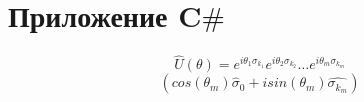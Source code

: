 \documentclass[a4paper]{report}
\begin{document}

\chapter*{Приложение C{$\#$}}

$${\hat{U}(\theta) = e^{i\theta_1\sigma_{k_1}}}e^{i\theta_2\sigma_{k_2}}\ldots e^{i\theta_{m} \sigma_{k_m}}$$
$$(cos(\theta_m)\hat{\sigma}_0 + isin(\theta_m)\hat{\sigma_{k_m}})$$
\end{document}
